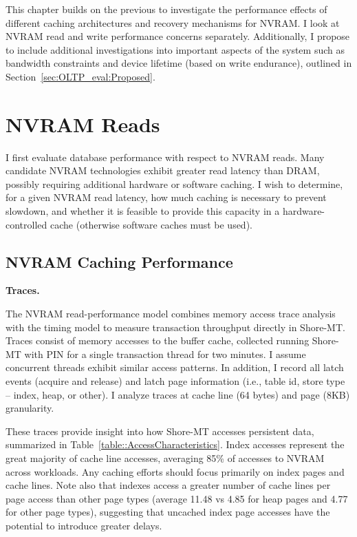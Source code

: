This chapter builds on the previous to investigate the performance effects of different caching architectures and recovery mechanisms for NVRAM.
I look at NVRAM read and write performance concerns separately.
Additionally, I propose to include additional investigations into important aspects of the system such as bandwidth constraints and device lifetime (based on write endurance), outlined in Section~\ref{sec:OLTP_eval:Proposed}.

\section{NVRAM Reads}
\label{sec:OLTP_eval:Reads}

I first evaluate database performance with respect to NVRAM reads.
Many candidate NVRAM technologies exhibit greater read latency than DRAM, possibly requiring additional hardware or software caching.
I wish to determine, for a given NVRAM read latency, how much caching is necessary to prevent slowdown, and whether it is feasible to provide this capacity in a hardware-controlled cache (otherwise software caches must be used).

\subsection{NVRAM Caching Performance}
\label{sec:OLTP_eval:Reads:Performance}

\textbf{Traces.}

The NVRAM read-performance model combines memory access trace analysis with the timing model to measure transaction throughput directly in Shore-MT.
Traces consist of memory accesses to the buffer cache, collected running Shore-MT with PIN for a single transaction thread for two minutes.
I assume concurrent threads exhibit similar access patterns.
In addition, I record all latch events (acquire and release) and latch page information (i.e., table id, store type -- index, heap, or other).
I analyze traces at cache line (64 bytes) and page (8KB) granularity.

These traces provide insight into how Shore-MT accesses persistent data, summarized in Table~\ref{table::AccessCharacteristics}.
Index accesses represent the great majority of cache line accesses, averaging 85\% of accesses to NVRAM across workloads.
Any caching efforts should focus primarily on index pages and cache lines.
Note also that indexes access a greater number of cache lines per page access than other page types (average 11.48 vs 4.85 for heap pages and 4.77 for other page types), suggesting that uncached index page accesses have the potential to introduce greater delays.

